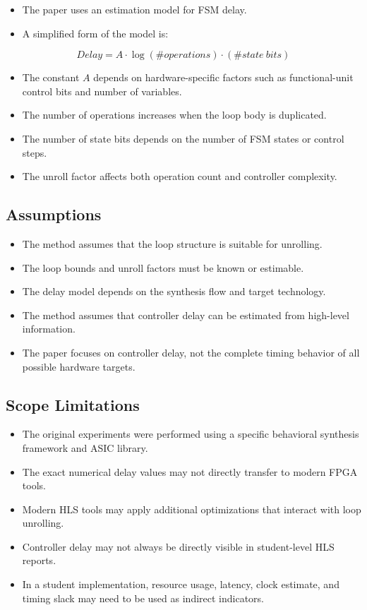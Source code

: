 \documentclass[conference]{IEEEtran}
\begin{document}
\begin{itemize}
    \item The paper uses an estimation model for FSM delay.
    \item A simplified form of the model is:
\end{itemize}

\begin{equation}
Delay = A \cdot \log(\#operations) \cdot (\#state\ bits)
\end{equation}

\begin{itemize}
    \item The constant $A$ depends on hardware-specific factors such as functional-unit control bits and number of variables.
    \item The number of operations increases when the loop body is duplicated.
    \item The number of state bits depends on the number of FSM states or control steps.
    \item The unroll factor affects both operation count and controller complexity.
\end{itemize}

\subsection{Assumptions}

\begin{itemize}
    \item The method assumes that the loop structure is suitable for unrolling.
    \item The loop bounds and unroll factors must be known or estimable.
    \item The delay model depends on the synthesis flow and target technology.
    \item The method assumes that controller delay can be estimated from high-level information.
    \item The paper focuses on controller delay, not the complete timing behavior of all possible hardware targets.
\end{itemize}

\subsection{Scope Limitations}

\begin{itemize}
    \item The original experiments were performed using a specific behavioral synthesis framework and ASIC library.
    \item The exact numerical delay values may not directly transfer to modern FPGA tools.
    \item Modern HLS tools may apply additional optimizations that interact with loop unrolling.
    \item Controller delay may not always be directly visible in student-level HLS reports.
    \item In a student implementation, resource usage, latency, clock estimate, and timing slack may need to be used as indirect indicators.
\end{itemize}
\end{document}
